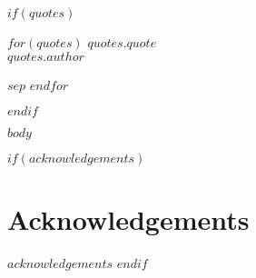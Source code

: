 \documentclass[a4paper, twoside]{tufte-book}
\newcommand{\openepigraph}[2]{%
  \large
  {\parindent0pt \emph{#1}}\\%
  \vspace{1pc}
  {\parindent0pt {#2}}%
}
\begin{document}
$if(quotes)$
\newpage\thispagestyle{empty}
\begin{fullwidth}
\null\vfill
$for(quotes)$
\openepigraph{$quotes.quote$}{$quotes.author$}
$sep$\vfill
$endfor$
\vfill
\end{fullwidth}
$endif$

\mainmatter

$body$

\backmatter

$if(acknowledgements)$
  \chapter{Acknowledgements}\label{acknowledgements}
  $acknowledgements$
$endif$

\begin{fullwidth}
  
  
\end{fullwidth}
\end{document}
